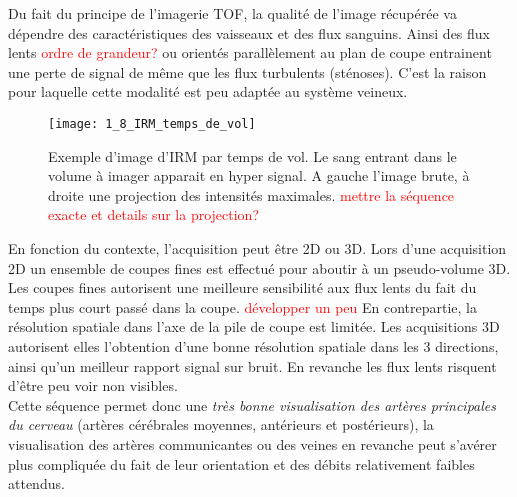 Du fait du principe de l’imagerie TOF, la qualité de l’image récupérée va dépendre des caractéristiques des vaisseaux et des flux sanguins. Ainsi des flux lents\textcolor{red}{ ordre de grandeur?}  ou orientés parallèlement au plan de coupe entrainent une perte de signal de même que les flux turbulents (sténoses). C’est la raison pour laquelle cette modalité est peu adaptée au système veineux.\\
\begin{figure}[!t]
\centering
\texttt{[image: 1\_8\_IRM\_temps\_de\_vol]}
\caption{Exemple d'image d'IRM par temps de vol. Le sang entrant dans le volume à imager apparait en hyper signal. A gauche l’image brute, à droite une projection des intensités maximales. \textcolor{red}{ mettre la séquence exacte et details sur la projection?}}
\label{fig:1_8_IRM_temps_de_vol}	
\end{figure}
En fonction du contexte, l’acquisition peut être 2D ou 3D. Lors d’une acquisition 2D un ensemble de coupes fines est effectué pour aboutir à un pseudo-volume 3D. Les coupes fines autorisent une meilleure sensibilité aux flux lents du fait du temps plus court passé dans la coupe. \textcolor{red}{ développer un peu} En contrepartie, la résolution spatiale dans l’axe de la pile de coupe est limitée. Les acquisitions 3D autorisent elles l’obtention d’une bonne résolution spatiale dans les 3 directions, ainsi qu’un meilleur rapport signal sur bruit. En revanche les flux lents risquent d’être peu voir non visibles.\\
Cette séquence permet donc une {\em très bonne visualisation des artères principales du cerveau} (artères cérébrales moyennes, antérieurs et postérieurs), la visualisation des artères communicantes ou des veines en revanche peut s’avérer plus compliquée du fait de leur orientation et des débits relativement faibles attendus.
